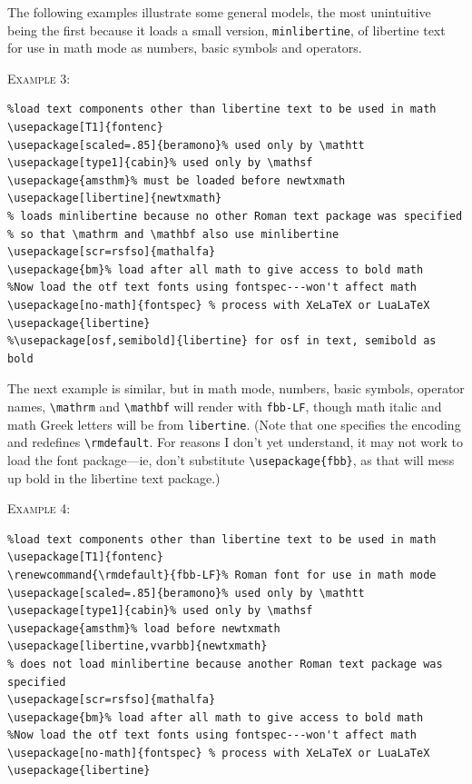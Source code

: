 \documentclass[11pt]{article}
\theoremstyle{oldplain}
\theoremstyle{plain}
\begin{document}
The following examples illustrate some general models, the most unintuitive being the first because it loads a small version, {\tt minlibertine}, of libertine text for use in math mode as numbers, basic symbols and operators.

\textsc{Example 3:}
\begin{verbatim}
%load text components other than libertine text to be used in math
\usepackage[T1]{fontenc}
\usepackage[scaled=.85]{beramono}% used only by \mathtt
\usepackage[type1]{cabin}% used only by \mathsf
\usepackage{amsthm}% must be loaded before newtxmath
\usepackage[libertine]{newtxmath}
% loads minlibertine because no other Roman text package was specified
% so that \mathrm and \mathbf also use minlibertine
\usepackage[scr=rsfso]{mathalfa}
\usepackage{bm}% load after all math to give access to bold math
%Now load the otf text fonts using fontspec---won't affect math
\usepackage[no-math]{fontspec} % process with XeLaTeX or LuaLaTeX
\usepackage{libertine}
%\usepackage[osf,semibold]{libertine} for osf in text, semibold as bold
\end{verbatim}
The next example is similar, but in math mode, numbers, basic symbols, operator names, \verb|\mathrm| and \verb|\mathbf| will render with {\tt fbb-LF}, though  math italic and math Greek letters will be from {\tt libertine}. (Note that one specifies the encoding and redefines \verb|\rmdefault|. For reasons I don't yet understand, it may not work to load the font package---ie, don't substitute \verb|\usepackage{fbb}|, as that will mess up bold in the libertine text package.) 

\textsc{Example 4:}
\begin{verbatim}
%load text components other than libertine text to be used in math
\usepackage[T1]{fontenc}
\renewcommand{\rmdefault}{fbb-LF}% Roman font for use in math mode
\usepackage[scaled=.85]{beramono}% used only by \mathtt
\usepackage[type1]{cabin}% used only by \mathsf
\usepackage{amsthm}% load before newtxmath
\usepackage[libertine,vvarbb]{newtxmath}
% does not load minlibertine because another Roman text package was specified
\usepackage[scr=rsfso]{mathalfa}
\usepackage{bm}% load after all math to give access to bold math
%Now load the otf text fonts using fontspec---won't affect math
\usepackage[no-math]{fontspec} % process with XeLaTeX or LuaLaTeX
\usepackage{libertine}
\end{verbatim}
\end{document}
